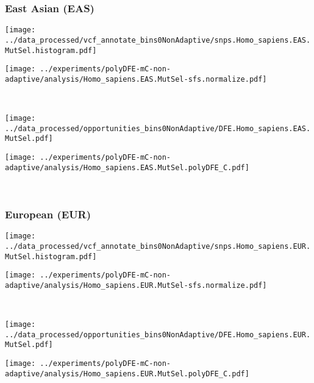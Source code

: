 \subsubsection{East Asian (EAS)}

\begin{minipage}{0.49\linewidth}
    \texttt{[image: ../data\_processed/vcf\_annotate\_bins0NonAdaptive/snps.Homo\_sapiens.EAS.MutSel.histogram.pdf]}
\end{minipage}
\begin{minipage}{0.49\linewidth}
    \texttt{[image: ../experiments/polyDFE-mC-non-adaptive/analysis/Homo\_sapiens.EAS.MutSel-sfs.normalize.pdf]}
\end{minipage}
\\
\begin{minipage}{0.49\linewidth}
    \texttt{[image: ../data\_processed/opportunities\_bins0NonAdaptive/DFE.Homo\_sapiens.EAS.MutSel.pdf]}
\end{minipage}
\begin{minipage}{0.49\linewidth}
    \texttt{[image: ../experiments/polyDFE-mC-non-adaptive/analysis/Homo\_sapiens.EAS.MutSel.polyDFE\_C.pdf]}
\end{minipage}
\\

\subsubsection{European (EUR)}

\begin{minipage}{0.49\linewidth}
    \texttt{[image: ../data\_processed/vcf\_annotate\_bins0NonAdaptive/snps.Homo\_sapiens.EUR.MutSel.histogram.pdf]}
\end{minipage}
\begin{minipage}{0.49\linewidth}
    \texttt{[image: ../experiments/polyDFE-mC-non-adaptive/analysis/Homo\_sapiens.EUR.MutSel-sfs.normalize.pdf]}
\end{minipage}
\\
\begin{minipage}{0.49\linewidth}
    \texttt{[image: ../data\_processed/opportunities\_bins0NonAdaptive/DFE.Homo\_sapiens.EUR.MutSel.pdf]}
\end{minipage}
\begin{minipage}{0.49\linewidth}
    \texttt{[image: ../experiments/polyDFE-mC-non-adaptive/analysis/Homo\_sapiens.EUR.MutSel.polyDFE\_C.pdf]}
\end{minipage}
\\

